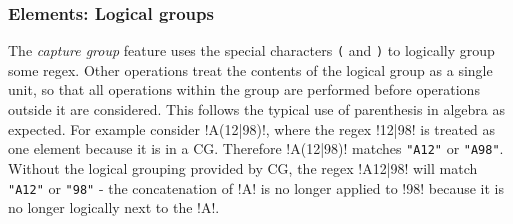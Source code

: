 \subsubsection{Elements: Logical groups}
\begin{description}  \itemsep -1pt
\item[CG:] The \emph{capture group} feature uses the special characters \verb!(! and \verb!)! to logically group some regex.  Other operations treat the contents of the logical group as a single unit, so that all operations within the group are performed before operations outside it are considered.  This follows the typical use of parenthesis in algebra as expected.  For example consider \cverb!A(12|98)!, where the regex \cverb!12|98! is treated as one element because it is in a CG.  Therefore \cverb!A(12|98)! matches \verb!"A12"! or \verb!"A98"!.  Without the logical grouping provided by CG, the regex \cverb!A12|98! will match \verb!"A12"! or \verb!"98"! - the concatenation of \cverb!A! is no longer applied to \cverb!98! because it is no longer logically next to the \cverb!A!.


\end{description}
